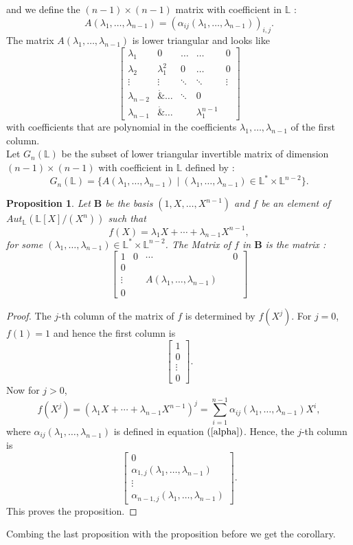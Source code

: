 \documentclass[12pt, reqno]{amsart}
\newtheorem{proposition}[theorem]{Proposition}
\newcommand{\FL}{ {\mathbb L} }
\begin{document}
and we define the $(n-1) \times (n-1)$ matrix with coefficient in $\FL$ : $$A(\lambda_1,\dots,\lambda_{n-1})=(\alpha_{ij}(\lambda_1,\dots,\lambda_{n-1}))_{i,j}.$$ The matrix $A(\lambda_1,\dots,\lambda_{n-1})$ is lower triangular and looks like 
 \[\begin{bmatrix}
    \lambda_1 & 0   & \dots& \dots &  0 \\
      \lambda_2 & \lambda_1^2   &  0 &\dots  &0 \\
    \vdots & \vdots &  \ddots & \ddots &\vdots \\
\lambda_{n-2} &  \dot & \dots  &\ddots &0\\
    \lambda_{n-1} &   \dot & \dots  & &\lambda_1^{n-1}
\end{bmatrix}
\]
with coefficients that are polynomial in the coefficients $\lambda_1,\dots,\lambda_{n-1}$ of the first column. \\
Let $G_n(\FL)$ be the subset of lower triangular invertible matrix of dimension $(n-1)\times (n-1)$ with coefficient in $\FL$ defined by :
$$G_n(\FL)=\{A(\lambda_1,\dots,\lambda_{n-1}) \mid (\lambda_1,\dots,\lambda_{n-1}) \in \FL^*\times\FL^{n-2}\}.$$
\begin{proposition}\label{Gnp}
Let $\mathbf{B}$ be the basis $(1, X, \dots, X^{n-1})$ and $f$ be an element of $Aut_\FL(\FL[X]/(X^n))$ such that $$f(X)=\lambda_1 X + \cdots + \lambda_{n-1} X^{n-1},$$ for some $(\lambda_1,\dots,\lambda_{n-1}) \in \FL^*\times \FL^{n-2}$. The Matrix of $f$ in $\mathbf{B}$ is the matrix :
 \[\begin{bmatrix}
   1 &  0   & \cdots& &  0 \\
      0 & \  &    &   & \\
    \vdots &  &   A(\lambda_1,\dots,\lambda_{n-1})    &  \\
0 &  &   &   & 
\end{bmatrix}
\]



\end{proposition}
 \begin{proof}
The $j$-th column of the matrix of $f$ is determined by $f(X^j)$. For $j=0$, $f(1)=1$ and hence the first column is $$\begin{bmatrix}
   1  \\
      0  \\
    \vdots   \\
0 
\end{bmatrix}.$$ Now for $j>0$, $$f(X^j)=(\lambda_1 X + \cdots + \lambda_{n-1} X^{n-1})^j=\overset{n-1}{\underset{i=1}{\sum}} \alpha_{ij}(\lambda_1,\dots,\lambda_{n-1}) X^i, $$where $\alpha_{ij}(\lambda_1,\dots,\lambda_{n-1}) $ is defined in equation $(\ref{alpha})$. Hence, the $j$-th column is $$\begin{bmatrix}
   0  \\
      \alpha_{1,j}(\lambda_1,\dots,\lambda_{n-1})  \\
    \vdots   \\
 \alpha_{n-1,j}(\lambda_1,\dots,\lambda_{n-1}) 
\end{bmatrix}.$$
This proves the proposition.
\end{proof}
Combing the last proposition with the proposition before we get the corollary.
\end{document}
